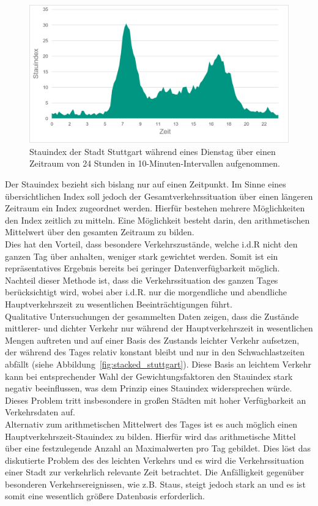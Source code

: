 \begin{figure}
  \centering
    \includegraphics[width=1.0\textwidth]{images/stauindex.png}
    \caption{Stauindex der Stadt Stuttgart während eines Dienstag über einen Zeitraum von 24 Stunden in 10-Minuten-Intervallen aufgenommen.}
    \label{fig:stauindex_stuttgart}
\end{figure}

Der Stauindex bezieht sich bislang nur auf einen Zeitpunkt. Im Sinne eines übersichtlichen Index soll jedoch der Gesamtverkehrssituation über einen längeren Zeitraum ein Index zugeordnet werden. Hierfür bestehen mehrere Möglichkeiten den Index zeitlich zu mitteln. Eine Möglichkeit besteht darin, den arithmetischen Mittelwert über den gesamten Zeitraum zu bilden.\\ Dies hat den Vorteil, dass besondere Verkehrszustände, welche i.d.R nicht den ganzen Tag über anhalten, weniger stark gewichtet werden. Somit ist ein repräsentatives Ergebnis bereits bei geringer Datenverfügbarkeit möglich.
Nachteil dieser Methode ist, dass die Verkehrssituation des ganzen Tages berücksichtigt wird, wobei aber i.d.R. nur die morgendliche und abendliche Hauptverkehrszeit zu wesentlichen Beeinträchtigungen führt.\\ Qualitative Untersuchungen der gesammelten Daten zeigen, dass die Zustände mittlerer- und dichter Verkehr nur während der Hauptverkehrszeit in wesentlichen Mengen auftreten und auf einer Basis des Zustands leichter Verkehr aufsetzen, der während des Tages relativ konstant bleibt und nur in den Schwachlastzeiten abfällt (siehe Abbildung~\ref{fig:stacked_stuttgart}). Diese Basis an leichtem Verkehr kann bei entsprechender Wahl der Gewichtungsfaktoren den Stauindex stark negativ beeinflussen, was dem Prinzip eines Stauindex widersprechen würde. Dieses Problem tritt insbesondere in großen Städten mit hoher Verfügbarkeit an Verkehrsdaten auf.\\ Alternativ zum arithmetischen Mittelwert des Tages ist es auch möglich einen Hauptverkehrszeit-Stauindex zu bilden. Hierfür wird das arithmetische Mittel über eine festzulegende Anzahl an Maximalwerten pro Tag gebildet. Dies löst das diskutierte Problem des des leichten Verkehrs und es wird die Verkehrssituation einer Stadt zur verkehrlich relevante Zeit betrachtet. Die Anfälligkeit gegenüber besonderen Verkehrsereignissen, wie z.B. Staus, steigt jedoch stark an und es ist somit eine wesentlich größere Datenbasis erforderlich. \\


